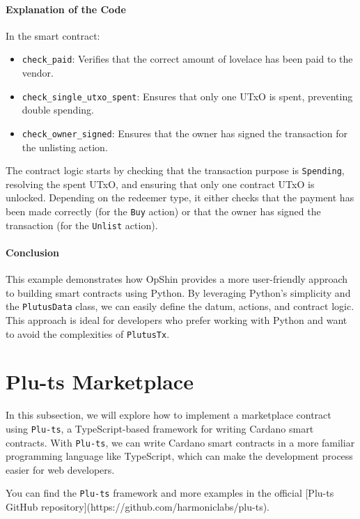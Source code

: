 \paragraph{Explanation of the Code}
In the smart contract:
\begin{itemize}
    \item \texttt{check\_paid}: Verifies that the correct amount of lovelace has been paid to the vendor.
    \item \texttt{check\_single\_utxo\_spent}: Ensures that only one UTxO is spent, preventing double spending.
    \item \texttt{check\_owner\_signed}: Ensures that the owner has signed the transaction for the unlisting action.
\end{itemize}

The contract logic starts by checking that the transaction purpose is \texttt{Spending}, resolving the spent UTxO, and ensuring that only one contract UTxO is unlocked. Depending on the redeemer type, it either checks that the payment has been made correctly (for the \texttt{Buy} action) or that the owner has signed the transaction (for the \texttt{Unlist} action).

\paragraph{Conclusion}
This example demonstrates how OpShin provides a more user-friendly approach to building smart contracts using Python. By leveraging Python's simplicity and the \texttt{PlutusData} class, we can easily define the datum, actions, and contract logic. This approach is ideal for developers who prefer working with Python and want to avoid the complexities of \texttt{PlutusTx}.


\section{Plu-ts Marketplace}

In this subsection, we will explore how to implement a marketplace contract using \texttt{Plu-ts}, a TypeScript-based framework for writing Cardano smart contracts. With \texttt{Plu-ts}, we can write Cardano smart contracts in a more familiar programming language like TypeScript, which can make the development process easier for web developers.

You can find the \texttt{Plu-ts} framework and more examples in the official [Plu-ts GitHub repository](https://github.com/harmoniclabs/plu-ts).

